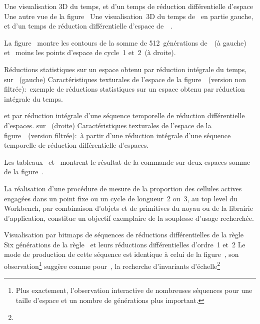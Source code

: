 %
{Une visualisation 3D du temps, et d'un temps de réduction différentiel\-le d'espace}%
{Une autre vue de la figure~}%
{Une visualisation~3D du temps de~ en partie gauche, %
  et d'un temps de réduction différentielle
  d'espace de~~.}

\noindent%
La figure~ montre les contours de
la somme de 512~générations de~~(à gauche)
et~ moins les points d'espace de cycle~1 et~2~(à droite). %

%
{Réductions statistiques sur un espace obtenu par réduction intégrale
  du temps,}%
{ sur ~(gauche)}%
{Caractéristiques texturales de l'espace de la
  figure~~(version non
  filtrée):~exemple de réductions statistiques sur un espace obtenu par
  réduction intégrale du temps.}%

%
{et par réduction intégrale d'une séquence
  temporelle de ré\-duc\-tion différentiel\-le d'espaces.}%
{ sur ~(droite)}%
{Caractéristiques texturales de l'espace de la
  figure~\protect{}~(version
  filtrée):~à partir d'une réduction intégrale d'une séquence
  temporelle de réduction différentielle d'espaces.}

\noindent Les tableaux~
et~ montrent le résultat de la commande
 sur deux espaces somme de la
figure~. %

La réalisation d'une procédure de mesure de la proportion des cellules
actives engagées dans un point fixe ou un cycle de longueur~2 ou~3, au
top level du Workbench, par combinaison d'objets et de primitives du
noyau ou de la librairie d'application, constitue un objectif
exemplaire de la souplesse d'usage recherchée. %

%
{Visualisation par bitmaps de séquences de réductions dif\-férentiel\-les
  de la règle~}%
{Six générations de la règle~ et leurs réductions dif\-fé\-ren\-tiel\-les
  d'ordre~1 et~2}%
{Le mode de production de cette séquence est identique à celui de la
  figure~, son observation\footnote{%
    Plus exactement, l'observation interactive de nombreuses séquences
    pour une taille d'espace et un nombre de générations plus
    important.} %
    suggère comme pour~, la recherche d'invariants
    d'échelle\footnote{%
      }}


